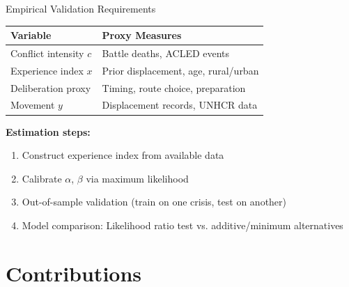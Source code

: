 \documentclass[aspectratio=169]{beamer}
\begin{document}
\begin{frame}{Empirical Validation Requirements}

\begin{table}
\centering
\begin{tabular}{ll}
\toprule
\textbf{Variable} & \textbf{Proxy Measures} \\
\midrule
Conflict intensity $c$ & Battle deaths, ACLED events \\
Experience index $x$ & Prior displacement, age, rural/urban \\
Deliberation proxy & Timing, route choice, preparation \\
Movement $y$ & Displacement records, UNHCR data \\
\bottomrule
\end{tabular}
\end{table}

\vspace{0.5em}

\textbf{Estimation steps:}
\begin{enumerate}
    \item Construct experience index from available data
    \item Calibrate $\alpha$, $\beta$ via maximum likelihood
    \item Out-of-sample validation (train on one crisis, test on another)
    \item Model comparison: Likelihood ratio test vs. additive/minimum alternatives
\end{enumerate}

\end{frame}

\section{Contributions}
\end{document}
